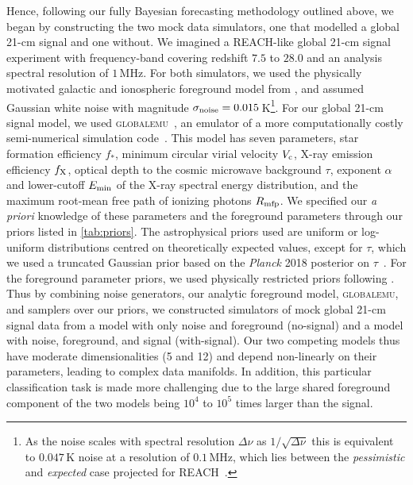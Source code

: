\documentclass[twocolumn,english,aps,prd,amsmath,amssymb,reprint,floatfix,nofootinbib,showkeys]{revtex4-2}
\newif\ifhighlightchanges
\newcommand{\change}[1]{{\ifhighlightchanges\color{red} #1\else #1\fi}}
\begin{document}
Hence, following our fully Bayesian forecasting methodology outlined above, we began by constructing the two mock data simulators\change{, one that modelled a global 21-cm signal and one without}. 
We imagined a REACH-like global 21-cm signal experiment with frequency-band covering redshift $7.5$ to $28.0$ and an analysis spectral resolution of $1$\,MHz.
\change{For both simulators, we used the physically motivated galactic and ionospheric foreground model from \citet{Hills_2018}, and assumed} Gaussian white noise with magnitude $\sigma_{\rm noise} = 0.015$\,K\footnote{As the noise scales with spectral resolution $\Delta \nu$ as $1/\sqrt{\Delta \nu}$ this is equivalent to \change{$0.047$\,K} noise at a resolution of $0.1$\,MHz, which lies \change{between the \textit{pessimistic} and \textit{expected}} case projected for REACH~\citep{REACH}.}.
For our global 21-cm signal model, we used \textsc{globalemu}~\citep{GLOBALEMU}, an emulator of a more computationally costly semi-numerical simulation code~\citep[e.g.,][]{Visbal_2012, Fialkov_2014, Reis_2020}. 
This model has seven parameters, star formation efficiency $f_{*}$, minimum circular virial velocity $V_{\rm c}$, X-ray emission efficiency $f_{\rm X}$, optical depth to the cosmic microwave background $\tau$, exponent $\alpha$ and lower-cutoff $E_{\rm min}$ of the X-ray spectral energy distribution, and the \change{maximum} root-mean free path of ionizing photons $R_{\rm mfp}$.
We specified our \textit{a priori} knowledge of these parameters \change{and the foreground parameters} through our priors listed in \cref{tab:priors}. 
The \change{astrophysical} priors \change{used} are uniform or log-uniform distributions \change{centred on theoretically expected values}, except for $\tau$, which we \change{used} a truncated Gaussian prior based on the \textit{Planck} 2018 \change{posterior on} $\tau$~\citep{Planck_VI}.
\change{For the foreground parameter priors, we used physically restricted priors following \citet{Hills_2018}.}
\change{Thus by} combining noise generators, \change{our analytic foreground model,} \textsc{globalemu}, and samplers over our priors, we constructed simulators of mock global 21-cm signal data from a model with only noise \change{and foreground} (\change{no-signal}) and a model with noise\change{, foreground, and }signal (\change{with-signal}).  
\change{Our two competing models thus have moderate dimensionalities (5 and 12) and depend non-linearly on their parameters, leading to complex data manifolds. 
In addition, this particular classification task is made more challenging due to the large shared foreground component of the two models being $10^4$ to $10^5$ times larger than the signal.}
\end{document}
